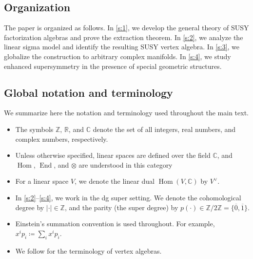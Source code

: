 \documentclass[final,reqno]{amsart}
\numberwithin{equation}{section}
\theoremstyle{definition}
\newcommand{\ol}{\overline}
\newcommand{\ceq}{\coloneqq} %
\newcommand{\bbC}{\mathbb{C}}
\newcommand{\bbR}{\mathbb{R}}
\newcommand{\bbZ}{\mathbb{Z}}
\newcommand{\ev}{\ol{0}}
\newcommand{\od}{\ol{1}}
\newcommand{\Zt}{\bbZ/2\bbZ}
\newcommand{\abs}[1]{\left| #1 \right|}
\DeclareMathOperator{\Hom}{Hom}
\DeclareMathOperator{\End}{End}
\begin{document}
\subsection*{Organization}

The paper is organized as follows. 
In \cref{s:1}, we develop the general theory of 
SUSY factorization algebras and prove the extraction theorem. 
In \cref{s:2}, we analyze the linear sigma model 
and identify the resulting SUSY vertex algebra. 
In \cref{s:3}, we globalize the construction to arbitrary complex manifolds.
In \cref{s:4}, we study enhanced supersymmetry 
in the presence of special geometric structures.

\subsection*{Global notation and terminology}

We summarize here the notation and terminology used throughout the main text.
\begin{itemize}
\item
The symbols $\bbZ$, $\bbR$, and $\bbC$ denote 
the set of all integers, real numbers, and complex numbers, respectively.

\item
Unless otherwise specified, 
linear spaces are defined over the field $\bbC$, 
and $\Hom$, $\End$, and $\otimes$ are understood in this category

\item
For a linear space $V$, we denote the linear dual $\Hom(V,\bbC)$ by $V^\vee$.

\item 
In \cref{s:2}--\cref{s:4}, we work in the dg super setting.
We denote the cohomological degree by $\abs{\cdot} \in \bbZ$,
and the parity (the super degree) by $p(\cdot)\in\Zt=\{\ev,\od\}$.

\item
Einstein's summation convention is used throughout. 
For example, $x^ip_i \ceq \sum_i x^i p_i$.

\item
We follow \cite{FB,K} for the terminology of vertex algebras.
\end{itemize}

\end{document}

